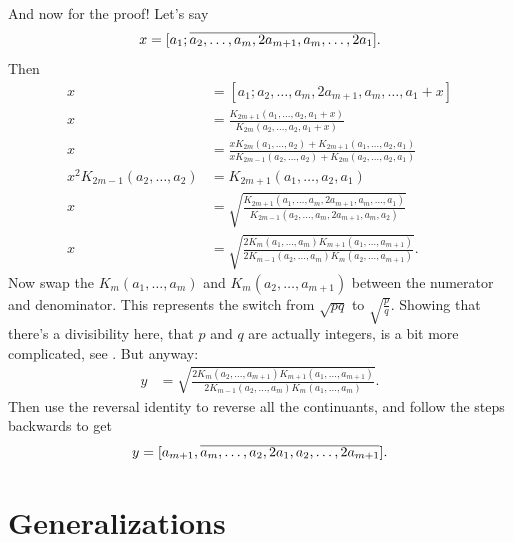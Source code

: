 \documentclass[11pt,paper=letter]{scrartcl}
\begin{document}
And now for the proof! Let's say \[
  x = [a_1; \overline{a_2, \ldots, a_m, 2a_{m+1}, a_m, \ldots, 2a_1}].
\]
Then
\begin{align*}
x &= [a_1; a_2, \ldots, a_m, 2a_{m+1}, a_m, \ldots, a_1 + x] \\
x &= \frac{K_{2m+1}(a_1, \ldots, a_2, a_1 + x)}{K_{2m}(a_2, \ldots, a_2, a_1 + x)} \\
x &= \frac{x K_{2m}(a_1, \ldots, a_2) + K_{2m+1}(a_1, \ldots, a_2, a_1)}{x K_{2m-1}(a_2, \ldots, a_2) + K_{2m}(a_2, \ldots, a_2, a_1)} \\
x^2 K_{2m-1}(a_2, \ldots, a_2) &= K_{2m+1}(a_1, \ldots, a_2, a_1) \\
x &= \sqrt{\frac{K_{2m+1}(a_1, \ldots, a_m, 2a_{m+1}, a_m, \ldots, a_1)}{K_{2m-1}(a_2, \ldots, a_m, 2a_{m+1}, a_m, a_2)}} \\
x &= \sqrt{\frac{2K_m(a_1, \ldots, a_m)K_{m+1}(a_1, \ldots, a_{m+1})}{2K_{m-1}(a_2, \ldots, a_m)K_m(a_2, \ldots, a_{m+1})}}.
\end{align*}
Now swap the $K_m(a_1, \ldots, a_m)$ and $K_m(a_2, \ldots, a_{m+1})$ between the numerator and denominator. This represents the switch from $\sqrt{pq}$ to $\sqrt{\frac{p}{q}}$. Showing that there's a divisibility here, that $p$ and $q$ are actually integers, is a bit more complicated, see \cite{van}. But anyway:
\begin{align*}
y &= \sqrt{\frac{2K_m(a_2, \ldots, a_{m+1})K_{m+1}(a_1, \ldots, a_{m+1})}{2K_{m-1}(a_2, \ldots, a_m)K_m(a_1, \ldots, a_m)}}.
\end{align*}
Then use the reversal identity to reverse all the continuants, and follow the steps backwards to get \[
  y = [a_{m+1}, \overline{a_m, \ldots, a_2, 2a_1, a_2, \ldots, 2a_{m+1}}].
\]

\section{Generalizations}
\end{document}
